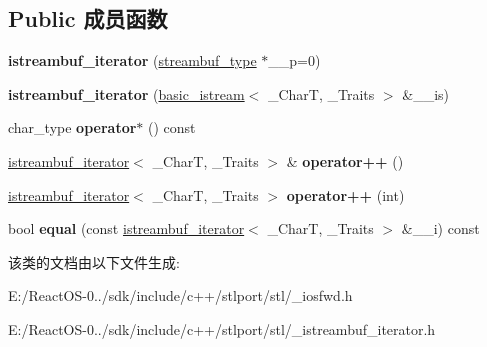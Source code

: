 \subsection*{Public 成员函数}
\begin{DoxyCompactItemize}
\item 
\mbox{\label{classistreambuf__iterator_aa9792601da4d6e29e9cc839c18fbd52a}} 
{\bfseries istreambuf\+\_\+iterator} (\hyperlink{classbasic__streambuf}{streambuf\+\_\+type} $\ast$\+\_\+\+\_\+p=0)
\item 
\mbox{\label{classistreambuf__iterator_a3226e46bbb1bf0f98b844181e181863f}} 
{\bfseries istreambuf\+\_\+iterator} (\hyperlink{classbasic__istream}{basic\+\_\+istream}$<$ \+\_\+\+CharT, \+\_\+\+Traits $>$ \&\+\_\+\+\_\+is)
\item 
\mbox{\label{classistreambuf__iterator_a45d5c2bdc121cfc56b314779ff05bfaa}} 
char\+\_\+type {\bfseries operator$\ast$} () const
\item 
\mbox{\label{classistreambuf__iterator_a89526d4418ff4ccc33755a4cc894197b}} 
\hyperlink{classistreambuf__iterator}{istreambuf\+\_\+iterator}$<$ \+\_\+\+CharT, \+\_\+\+Traits $>$ \& {\bfseries operator++} ()
\item 
\mbox{\label{classistreambuf__iterator_a3b2c1fb7a830e766d5f72079331f2c28}} 
\hyperlink{classistreambuf__iterator}{istreambuf\+\_\+iterator}$<$ \+\_\+\+CharT, \+\_\+\+Traits $>$ {\bfseries operator++} (int)
\item 
\mbox{\label{classistreambuf__iterator_a3a25d751ee6bc4ae57a4f76d289cff95}} 
bool {\bfseries equal} (const \hyperlink{classistreambuf__iterator}{istreambuf\+\_\+iterator}$<$ \+\_\+\+CharT, \+\_\+\+Traits $>$ \&\+\_\+\+\_\+i) const
\end{DoxyCompactItemize}


该类的文档由以下文件生成\+:\begin{DoxyCompactItemize}
\item 
E\+:/\+React\+O\+S-\/0../sdk/include/c++/stlport/stl/\+\_\+iosfwd.\+h\item 
E\+:/\+React\+O\+S-\/0../sdk/include/c++/stlport/stl/\+\_\+istreambuf\+\_\+iterator.\+h\end{DoxyCompactItemize}
